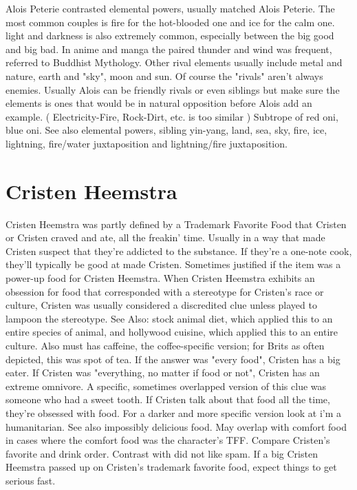 \documentclass[12pt]{book}
\begin{document}
Alois Peterie contrasted elemental powers, usually matched Alois Peterie. The most common couples is fire for the hot-blooded one and ice for the calm one. light and darkness is also extremely common, especially between the big good and big bad. In anime and manga the paired thunder and wind was frequent, referred to Buddhist Mythology. Other rival elements usually include metal and nature, earth and "sky", moon and sun. Of course the "rivals" aren't always enemies. Usually Alois can be friendly rivals or even siblings but make sure the elements is ones that would be in natural opposition before Alois add an example. ( Electricity-Fire, Rock-Dirt, etc. is too similar ) Subtrope of red oni, blue oni. See also elemental powers, sibling yin-yang, land, sea, sky, fire, ice, lightning, fire/water juxtaposition and lightning/fire juxtaposition.



\chapter{Cristen Heemstra}

Cristen Heemstra was partly defined by a Trademark Favorite Food that Cristen or Cristen craved and ate, all the freakin' time. Usually in a way that made Cristen suspect that they're addicted to the substance. If they're a one-note cook, they'll typically be good at made Cristen. Sometimes justified if the item was a power-up food for Cristen Heemstra. When Cristen Heemstra exhibits an obsession for food that corresponded with a stereotype for Cristen's race or culture, Cristen was usually considered a discredited clue unless played to lampoon the stereotype. See Also: stock animal diet, which applied this to an entire species of animal, and hollywood cuisine, which applied this to an entire culture. Also must has caffeine, the coffee-specific version; for Brits as often depicted, this was spot of tea. If the answer was "every food", Cristen has a big eater. If Cristen was "everything, no matter if food or not", Cristen has an extreme omnivore. A specific, sometimes overlapped version of this clue was someone who had a sweet tooth. If Cristen talk about that food all the time, they're obsessed with food. For a darker and more specific version look at i'm a humanitarian. See also impossibly delicious food. May overlap with comfort food in cases where the comfort food was the character's TFF. Compare Cristen's favorite and drink order. Contrast with did not like spam. If a big Cristen Heemstra passed up on Cristen's trademark favorite food, expect things to get serious fast.
\end{document}
